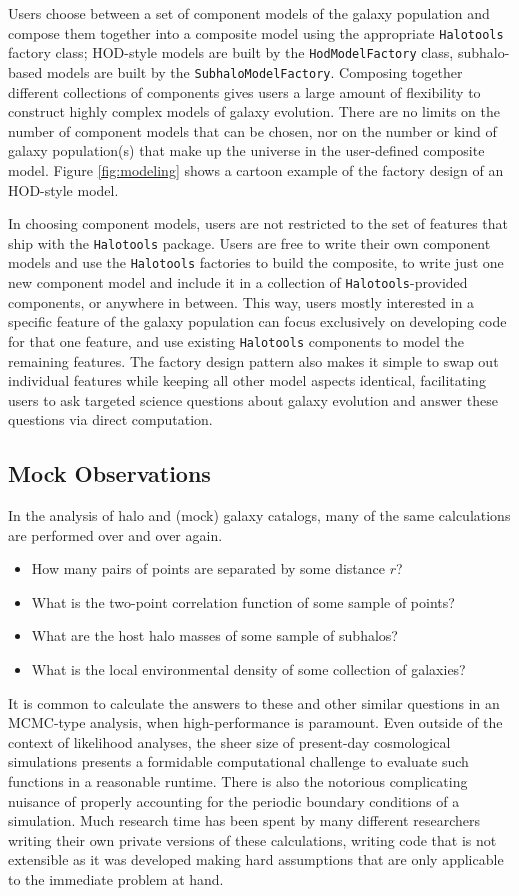 \documentclass[twocolumn, tighten]{aastex6}
\newcommand{\bit}{\begin{itemize}}
\newcommand{\eit}{\end{itemize}}
\begin{document}
Users choose between a set of component models of the galaxy population and compose them together into a composite model using the appropriate {\tt Halotools} factory class; HOD-style models are built by the {\tt HodModelFactory} class, subhalo-based models are built by the {\tt SubhaloModelFactory}. Composing together different collections of components gives users a large amount of flexibility to construct highly complex models of galaxy evolution. There are no limits on the number of component models that can be chosen, nor on the number or kind of galaxy population(s) that make up the universe in the user-defined composite model. Figure \ref{fig:modeling} shows a cartoon example of the factory design of an HOD-style model.

In choosing component models, users are not restricted to the set of features that ship with the {\tt Halotools} package. Users are free to write their own component models and use the {\tt Halotools} factories to build the composite, to write just one new component model and include it in a collection of {\tt Halotools}-provided components, or anywhere in between. This way, users mostly interested in a specific feature of the galaxy population can focus exclusively on developing code for that one feature, and use existing {\tt Halotools} components to model the remaining features. The factory design pattern also makes it simple to swap out individual features while keeping all other model aspects identical, facilitating users to ask targeted science questions about galaxy evolution and answer these questions via direct computation.

\subsection{Mock Observations}
\label{subsection:mock_observables}


In the analysis of halo and (mock) galaxy catalogs, many of the same calculations are performed over and over again. 
\bit
\item How many pairs of points are separated by some distance $r$? 
\item What is the two-point correlation function of some sample of points? 
\item What are the host halo masses of some sample of subhalos? 
\item What is the local environmental density of some collection of galaxies? 
\eit
It is common to calculate the answers to these and other similar questions in an MCMC-type analysis, when high-performance is paramount. Even outside of the context of likelihood analyses, the sheer size of present-day cosmological simulations presents a formidable computational challenge to evaluate such functions in a reasonable runtime. There is also the notorious complicating nuisance of properly accounting for the periodic boundary conditions of a simulation. Much research time has been spent by many different researchers writing their own private versions of these calculations, writing code that is not extensible as it was developed making hard assumptions that are only applicable to the immediate problem at hand.
\end{document}
